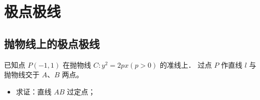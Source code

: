 \section{极点极线}

\subsection{抛物线上的极点极线}

\begin{example}
    已知点 $P(-1,1)$ 在抛物线 $C: y^2=2 p x(p>0)$ 的准线上．
    过点 $P$ 作直线 $l$ 与抛物线交于 $A$、$B$ 两点。
    \begin{itemize}
        \item 求证：直线 $A B$ 过定点；
    \end{itemize}
\end{example}